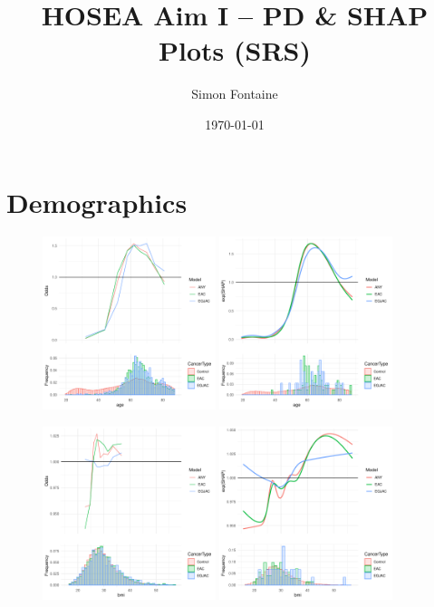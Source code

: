 \documentclass[12pt]{article}
\title{HOSEA Aim I -- PD \& SHAP Plots (SRS)}
\author{Simon Fontaine}
\date{\today}
\begin{document}
\maketitle

\newpage
\clearpage
\section{Demographics}

\begin{figure}[h]
\centering
\includegraphics[width=0.45\textwidth]{pdp/age.pdf}
\includegraphics[width=0.45\textwidth]{shap/age.pdf}
\end{figure}
\begin{figure}[h]
\centering
\includegraphics[width=0.45\textwidth]{pdp/bmi.pdf}
\includegraphics[width=0.45\textwidth]{shap/bmi.pdf}
\end{figure}
\end{document}

